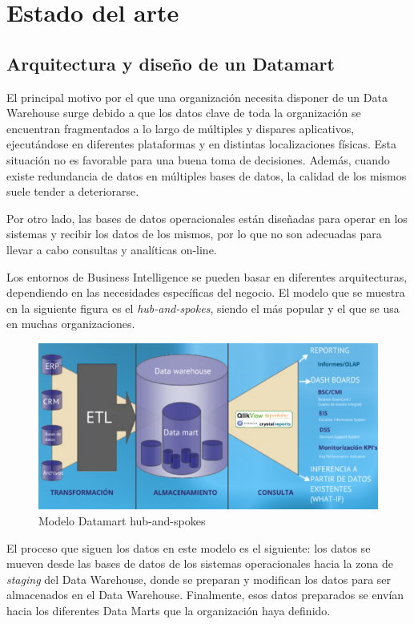 \documentclass[a4paper, 12pt]{book}
\begin{document}
\cleardoublepage
\chapter{Estado del arte}

\section{Arquitectura y diseño de un Datamart} 
\label{sec:datamart}
El principal motivo por el que una organización necesita disponer de un Data Warehouse surge debido a que los datos clave de toda la organización se encuentran fragmentados a lo largo de múltiples y dispares aplicativos, ejecutándose en diferentes plataformas y en distintas localizaciones físicas. Esta situación no es favorable para una buena toma de decisiones. Además, cuando existe redundancia de datos en múltiples bases de datos, la calidad de los mismos suele tender a deteriorarse.

Por otro lado, las bases de datos operacionales están diseñadas para operar en los sistemas y recibir los datos de los mismos, por lo que no son adecuadas para llevar a cabo consultas y analíticas on-line.

Los entornos de Business Intelligence se pueden basar en diferentes arquitecturas, dependiendo en las necesidades específicas del negocio. El modelo que se muestra en la siguiente figura es el \textit{hub-and-spokes}, siendo el más popular y el que se usa en muchas organizaciones.

\begin{figure}
   \centering
   \includegraphics[width=14cm, keepaspectratio]{img/modelo_Datamart}
   \caption{Modelo Datamart hub-and-spokes}
   \label{fig:modelo_Datamart}
\end{figure}

El proceso que siguen los datos en este modelo es el siguiente: los datos se mueven desde las bases de datos de los sistemas operacionales hacia la zona de \textit{staging} del Data Warehouse, donde se preparan y modifican los datos para ser almacenados en el Data Warehouse. Finalmente, esos datos preparados se envían hacia los diferentes Data Marts que la organización haya definido.
\end{document}
